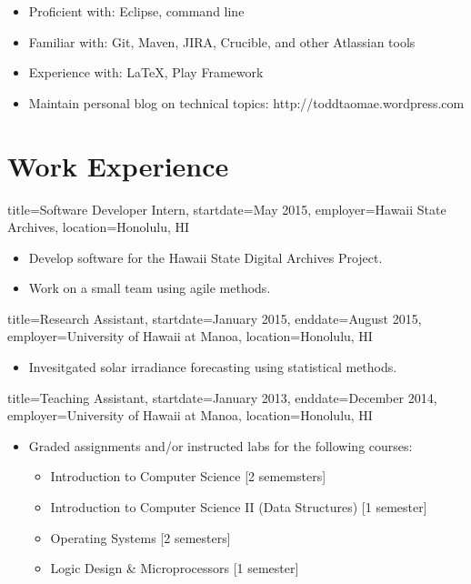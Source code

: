 \documentclass{resume}
\begin{document}
\begin{itemize}
    \item{Proficient with: Eclipse, command line}
    \item{Familiar with: Git, Maven, JIRA, Crucible, and other Atlassian tools}
    \item{Experience with: \LaTeX, Play Framework}
\end{itemize}

\begin{itemize}
    \item{Maintain personal blog on technical topics: http://toddtaomae.wordpress.com}
\end{itemize}


\section*{Work Experience}
\begin{job}{title=Software Developer Intern,
            startdate=May 2015,
            employer=Hawaii State Archives,
            location={Honolulu, HI}}
    \begin{itemize}
        \item{Develop software for the Hawaii State Digital Archives Project.}
        \item{Work on a small team using agile methods.}
    \end{itemize}
\end{job}

\begin{job}{title=Research Assistant,
            startdate=January 2015,
            enddate=August 2015,
            employer=University of Hawaii at Manoa,
            location={Honolulu, HI}}
    \begin{itemize}
        \item{Invesitgated solar irradiance forecasting using statistical methods.}
    \end{itemize}
\end{job}

\begin{job}{title=Teaching Assistant,
            startdate=January 2013,
            enddate=December 2014,
            employer=University of Hawaii at Manoa,
            location={Honolulu, HI}}
    \begin{itemize}
        \item{Graded assignments and/or instructed labs for the following courses:}
        \begin{itemize}
            \item{Introduction to Computer Science [2 sememsters]}
            \item{Introduction to Computer Science II (Data Structures) [1 semester]}
            \item{Operating Systems [2 semesters]}
            \item{Logic Design \& Microprocessors [1 semester]}
        \end{itemize}
    \end{itemize}
\end{job}
\end{document}
